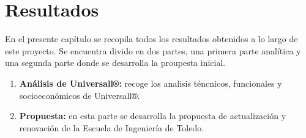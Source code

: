 \chapter{Resultados}
\label{ch:resultados}

En el presente capítulo se recopila todos los resultados obtenidos a lo largo de este proyecto. Se encuentra divido en dos partes, una primera parte analítica y una segunda parte donde se desarrolla la proupesta inicial.
\begin{enumerate}
\item \textbf{Análisis de Universall®:} recoge los analisis téncnicos, funcionales y socioeconómicos de Universall®.
\item \textbf{Propuesta:} en esta parte se desarrolla la propuesta de actualización y renovación de la Escuela de Ingeniería de Toledo.
\end{enumerate}


